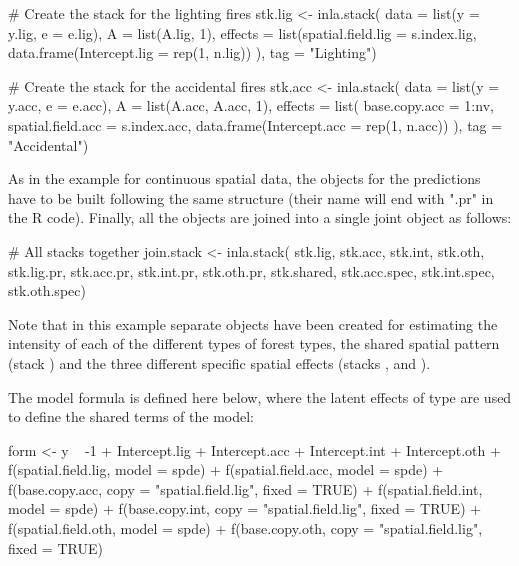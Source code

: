\begin{example*} 
# Create the stack for the lighting fires
stk.lig <- inla.stack(
  data = list(y = y.lig, e = e.lig),
  A = list(A.lig, 1),
  effects = list(spatial.field.lig = s.index.lig, 
    data.frame(Intercept.lig = rep(1, n.lig)) 
    ),
  tag = "Lighting")

# Create the stack for the accidental fires
stk.acc <- inla.stack(
  data = list(y = y.acc, e = e.acc), 
  A = list(A.acc, A.acc, 1), 
  effects = list(
    base.copy.acc = 1:nv, 
    spatial.field.acc = s.index.acc, 
    data.frame(Intercept.acc = rep(1, n.acc))
    ),
  tag = "Accidental")
\end{example*}

As in the example for continuous spatial data, the  objects for the predictions have to be built following the same structure (their name will end with ".pr" in the R code). Finally, all the  objects are joined into a single joint  object as follows: 

\begin{example*}

# All stacks together
join.stack <- inla.stack(
  stk.lig, stk.acc, stk.int, stk.oth, 
  stk.lig.pr, stk.acc.pr, stk.int.pr, stk.oth.pr, 
  stk.shared, stk.acc.spec, stk.int.spec, stk.oth.spec)

\end{example*}

\noindent
Note that in this example separate  objects have been created for estimating the intensity of each of the different types of forest types,  the shared spatial pattern (stack ) and the three different specific spatial effects (stacks ,  and ). 

The model formula is defined here below, where the latent effects of type
 are used to define the shared terms of the model: 

\begin{example*} form <- y ~ -1 + Intercept.lig + Intercept.acc + Intercept.int + Intercept.oth +
  f(spatial.field.lig, model = spde) +
  f(spatial.field.acc, model = spde) + 
  f(base.copy.acc, copy = "spatial.field.lig", fixed = TRUE) +
  f(spatial.field.int, model = spde) + 
  f(base.copy.int, copy = "spatial.field.lig", fixed = TRUE) +
  f(spatial.field.oth, model = spde) + 
  f(base.copy.oth, copy = "spatial.field.lig", fixed = TRUE)    

\end{example*}

